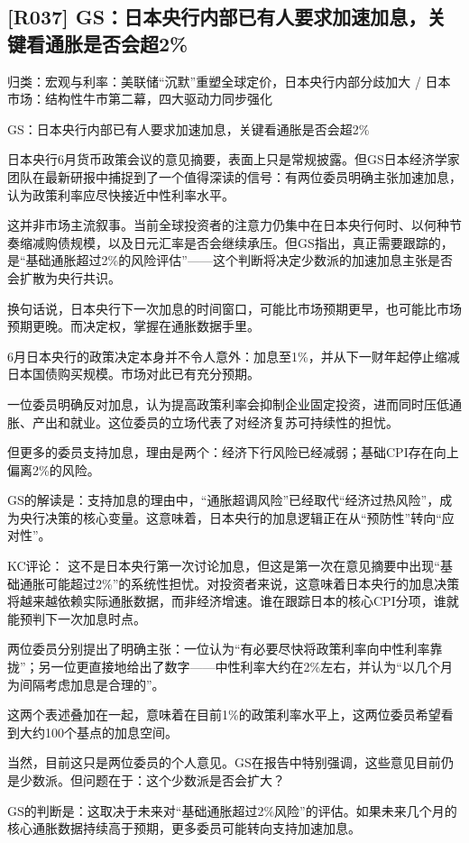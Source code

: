 \documentclass[11pt]{ctexart}
\begin{document}
\subsection{[R037] GS：日本央行内部已有人要求加速加息，关键看通胀是否会超2\%}
{\small\color{refgray}归类：宏观与利率：美联储“沉默”重塑全球定价，日本央行内部分歧加大 / 日本市场：结构性牛市第二幕，四大驱动力同步强化}

GS：日本央行内部已有人要求加速加息，关键看通胀是否会超2\%

日本央行6月货币政策会议的意见摘要，表面上只是常规披露。但GS日本经济学家团队在最新研报中捕捉到了一个值得深读的信号：有两位委员明确主张加速加息，认为政策利率应尽快接近中性利率水平。

这并非市场主流叙事。当前全球投资者的注意力仍集中在日本央行何时、以何种节奏缩减购债规模，以及日元汇率是否会继续承压。但GS指出，真正需要跟踪的，是“基础通胀超过2\%的风险评估”——这个判断将决定少数派的加速加息主张是否会扩散为央行共识。

换句话说，日本央行下一次加息的时间窗口，可能比市场预期更早，也可能比市场预期更晚。而决定权，掌握在通胀数据手里。

6月日本央行的政策决定本身并不令人意外：加息至1\%，并从下一财年起停止缩减日本国债购买规模。市场对此已有充分预期。

一位委员明确反对加息，认为提高政策利率会抑制企业固定投资，进而同时压低通胀、产出和就业。这位委员的立场代表了对经济复苏可持续性的担忧。

但更多的委员支持加息，理由是两个：经济下行风险已经减弱；基础CPI存在向上偏离2\%的风险。

GS的解读是：支持加息的理由中，“通胀超调风险”已经取代“经济过热风险”，成为央行决策的核心变量。这意味着，日本央行的加息逻辑正在从“预防性”转向“应对性”。

KC评论： 这不是日本央行第一次讨论加息，但这是第一次在意见摘要中出现“基础通胀可能超过2\%”的系统性担忧。对投资者来说，这意味着日本央行的加息决策将越来越依赖实际通胀数据，而非经济增速。谁在跟踪日本的核心CPI分项，谁就能预判下一次加息时点。

两位委员分别提出了明确主张：一位认为“有必要尽快将政策利率向中性利率靠拢”；另一位更直接地给出了数字——中性利率大约在2\%左右，并认为“以几个月为间隔考虑加息是合理的”。

这两个表述叠加在一起，意味着在目前1\%的政策利率水平上，这两位委员希望看到大约100个基点的加息空间。

当然，目前这只是两位委员的个人意见。GS在报告中特别强调，这些意见目前仍是少数派。但问题在于：这个少数派是否会扩大？

GS的判断是：这取决于未来对“基础通胀超过2\%风险”的评估。如果未来几个月的核心通胀数据持续高于预期，更多委员可能转向支持加速加息。
\end{document}
